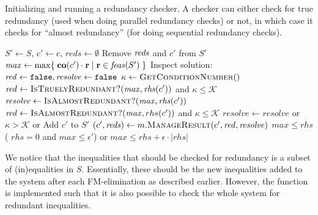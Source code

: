 \begin{algorithm}[htbp]
\begin{algorithmic}\caption{Initializing and running a redundancy checker. A checker can either check for true redundancy (used when doing parallel redundancy checks) or not, in which case it checks for ``almost redundancy'' (for doing sequential redundancy checks).}\label{alg:checker}
	\State $S'\gets S$, $c'\gets c$, $\mathit{reds}\gets \emptyset$
		\State Remove $\mathit{reds}$ and $c'$ from $S'$
		\State $\mathit{max} \gets \max\{\;{\mathbf{co}(c')\cdot\mathbf{r}}\;|\;{\mathbf{r}\in \mathit{feas}(S')}\;\}$
		\State Inspect solution:
		\Indent
			\State $\mathit{red}\gets \texttt{false}, \mathit{resolve}\gets \texttt{false}$
			\State $\kappa\gets \Call{GetConditionNumber}{\null}$
				\State $\mi{red} \gets \Call{IsTruelyRedundant?}{\mathit{max}, \rhs(c')}$ and $\kappa\leq \mathcal{K}$
				\State $\mathit{resolve} \gets \Call{IsAlmostRedundant?}{\mathit{max}, \rhs(c')}$
			\Else
				\State$\mi{red} \gets \Call{IsAlmostRedundant?}{\mathit{max}, rhs(c')}$ and $\kappa\leq\mathcal{K}$
			\EndIf
			\State $\mathit{resolve} \gets \mathit{resolve}$ or $\kappa>\mathcal{K}$ or 
		\EndIndent
			\State Add $c'$ to $S'$
		\EndIf
		\State $(c', \mi{reds})\gets m.\Call{ManageResult}{c', \mathit{red}, \mathit{resolve}}$
	\EndWhile
	\Return
\EndFunction
\State
{}
	\State\Return $\mathit{max} \leq \mathit{rhs}$
\EndFunction
\State
{}
		\State\Return ( $\mathit{rhs} = 0$ and $\mathit{max} \leq \epsilon'$) or 
				$\mathit{max} \leq \mathit{rhs} + \epsilon\cdot |\mathit{rhs}|$
\EndFunction
\end{algorithmic}
\end{algorithm}

We notice that the inequalities that should be checked for redundancy is a subset of (in)equalities in $S$. Essentially, these should be the new inequalities added to the system after each FM-elimination as described earlier. However, the function is implemented such that it is also possible to check the whole system for redundant inequalities.

